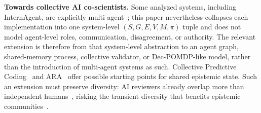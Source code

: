 \documentclass{article}
\begin{document}
\textbf{Towards collective AI co-scientists.} Some analyzed systems, including InternAgent, are explicitly multi-agent~\citep{zhang2025novelseek}; this paper nevertheless collapses each implementation into one system-level $(S,G,E,V,M,\pi)$ tuple and does not model agent-level roles, communication, disagreement, or authority. The relevant extension is therefore from that system-level abstraction to an agent graph, shared-memory process, collective validator, or Dec-POMDP-like model, rather than the introduction of multi-agent systems as such. Collective Predictive Coding~\citep{taniguchi2024cpc} and ARA~\citep{liu2026lasthuman} offer possible starting points for shared epistemic state. Such an extension must preserve diversity: AI reviewers already overlap more than independent humans~\citep{kim2026aireviewers}, risking the transient diversity that benefits epistemic communities~\citep{zollman2010epistemic}.
\end{document}
